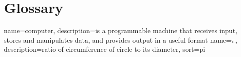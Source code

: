 \documentclass[float=false, crop=false]{standalone}
\begin{document}
\chapter{Glossary}
{
  name=computer,
  description={is a programmable machine that receives input,
               stores and manipulates data, and provides
               output in a useful format}
}
{
  name={\ensuremath{\pi}},
  description={ratio of circumference of circle to its
               diameter},
  sort=pi
}
\end{document}
